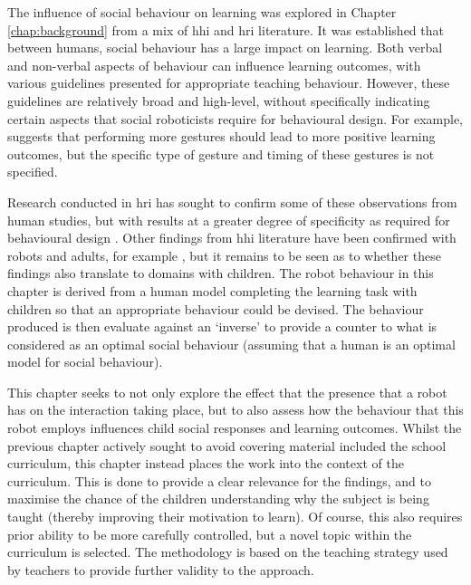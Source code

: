 The influence of social behaviour on \gls{learning} was explored in Chapter \ref{chap:background} from a mix of \acrshort{hhi} and \acrshort{hri} literature. It was established that between humans, social behaviour has a large impact on \gls{learning}. Both verbal \citep{gorham1988relationship} and non-verbal \citep{richmond2003development} aspects of behaviour can influence learning outcomes, with various guidelines presented for appropriate teaching behaviour. However, these guidelines are relatively broad and high-level, without specifically indicating certain aspects that social roboticists require for behavioural design. For example, \cite{richmond2003development} suggests that performing more gestures should lead to more positive \gls{learning} outcomes, but the specific type of gesture and timing of these gestures is not specified.

Research conducted in \acrshort{hri} has sought to confirm some of these observations from human studies, but with results at a greater degree of specificity as required for behavioural design \citep{huang2013modeling}. Other findings from \acrshort{hhi} literature have been confirmed with robots and adults, for example \cite{szafir2012pay}, but it remains to be seen as to whether these findings also translate to domains with children. The robot behaviour in this chapter is derived from a human model completing the \gls{learning} task with children so that an appropriate behaviour could be devised. The behaviour produced is then evaluate against an `inverse' to provide a counter to what is considered as an optimal social behaviour (assuming that a human is an optimal model for social behaviour).

This chapter seeks to not only explore the effect that the presence that a robot has on the interaction taking place, but to also assess how the behaviour that this robot employs influences child social responses and \gls{learning} outcomes. Whilst the previous chapter actively sought to avoid covering material included the school curriculum, this chapter instead places the work into the context of the curriculum. This is done to provide a clear relevance for the findings, and to maximise the chance of the children understanding why the subject is being taught (thereby improving their motivation to learn). Of course, this also requires prior ability to be more carefully controlled, but a novel topic within the curriculum is selected. The methodology is based on the teaching strategy used by teachers to provide further validity to the approach.

